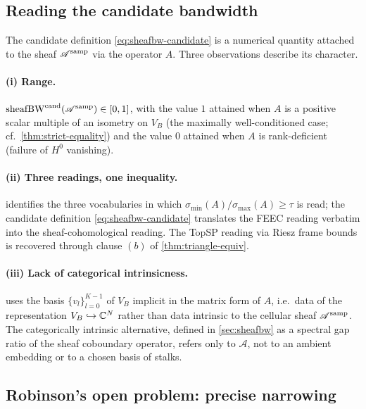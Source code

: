 \subsection{Reading the candidate bandwidth}\label{subsec:tri-bw-candidate}

The candidate definition \cref{eq:sheafbw-candidate} is a numerical
quantity attached to the sheaf $\mathscr{A}^{\mathrm{samp}}$ via the operator $A$. Three
observations describe its character.

\paragraph{(i) Range.}
$\operatorname{sheafBW}^{\mathrm{cand}}(\mathscr{A}^{\mathrm{samp}}) \in [0, 1]$, with the value $1$
attained when $A$ is a positive scalar multiple of an isometry on
$V_B$ (the maximally well-conditioned case;
cf.\ \cref{thm:strict-equality}) and the value $0$ attained when $A$
is rank-deficient (failure of $H^0$ vanishing).

\paragraph{(ii) Three readings, one inequality.}
 identifies the three vocabularies in which
$\sigma_{\min}(A) / \sigma_{\max}(A) \ge \tau$ is read; the candidate
definition \cref{eq:sheafbw-candidate} translates the FEEC reading
verbatim into the sheaf-cohomological reading. The TopSP reading via
Riesz frame bounds is recovered through clause $(b)$ of
\cref{thm:triangle-equiv}.

\paragraph{(iii) Lack of categorical intrinsicness.}
 uses the basis $\{v_l\}_{l=0}^{K-1}$ of
$V_B$ implicit in the matrix form of $A$, i.e.\ data of the
representation $V_B \hookrightarrow \mathbb{C}^N$ rather than data intrinsic
to the cellular sheaf $\mathscr{A}^{\mathrm{samp}}$. The categorically intrinsic
alternative, defined in \cref{sec:sheafbw} as a spectral gap ratio
of the sheaf coboundary operator, refers only to $\mathscr{A}$, not
to an ambient embedding or to a chosen basis of stalks.

\subsection{Robinson's open problem: precise narrowing}\label{subsec:tri-narrowing}

